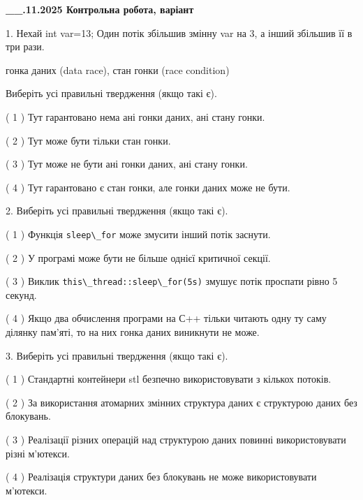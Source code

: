 \documentclass[12pt, ukrainian]{article}
\def\code#1{\Verb!#1!}
\begin{document}
\newpage
\begin {large}

\textbf{\_\_.11.2025 Контрольна робота, варіант  }\par


{
1. Нехай int var=13; Один потік збільшив змінну var на 3, а інший збільшив її в три рази.

гонка даних (data race), стан гонки (race condition)

Виберіть усі правильні твердження (якщо такі є).\par
\vspace{2mm}
( 1 ) Тут гарантовано нема ані гонки даних, ані стану гонки.%

( 2 ) Тут може бути тільки стан гонки.%

( 3 ) Тут може не бути ані гонки даних, ані стану гонки.%

( 4 ) Тут гарантовано є стан гонки, але гонки даних може не бути.%


2. Виберіть усі правильні твердження (якщо такі є).\par
\vspace{2mm}

( 1 ) Функція \code{sleep\_for} може змусити інший потік заснути.%

( 2 ) У програмі може бути не більше однієї критичної секції.%

( 3 ) Виклик \code{this\_thread::sleep\_for(5s)} змушує потік проспати рівно 5 секунд.%

( 4 ) Якщо два обчислення програми на С++ тільки читають одну ту саму ділянку пам'яті, то на них гонка даних  виникнути не може.%


3. Виберіть усі правильні твердження (якщо такі є).\par
\vspace{2mm}

( 1 ) Стандартні контейнери stl безпечно використовувати з кількох потоків.%

( 2 ) За використання атомарних змінних структура даних є структурою даних без блокувань.%

( 3 ) Реалізації різних операцій над структурою даних повинні використовувати різні м’ютекси.%

( 4 ) Реалізація структури даних без блокувань не може використовувати м’ютекси.%


}
\end{large}
\end{document}
